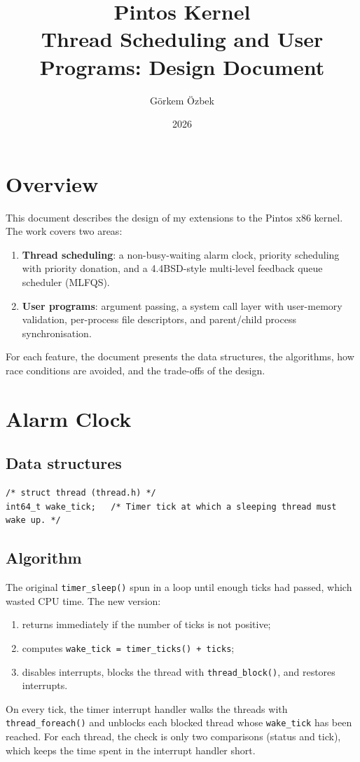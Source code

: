 \documentclass[a4paper,11pt]{article}
\title{\textbf{Pintos Kernel}\\[0.3em]\large Thread Scheduling and User Programs: Design Document}
\author{G\"orkem \"Ozbek}
\date{2026}
\newcommand{\code}[1]{\texttt{#1}}
\begin{document}
\maketitle
\thispagestyle{fancy}

\section*{Overview}

This document describes the design of my extensions to the Pintos x86 kernel. The work covers two areas:

\begin{enumerate}
  \item \textbf{Thread scheduling}: a non-busy-waiting alarm clock, priority scheduling with priority donation, and a 4.4BSD-style multi-level feedback queue scheduler (MLFQS).
  \item \textbf{User programs}: argument passing, a system call layer with user-memory validation, per-process file descriptors, and parent/child process synchronisation.
\end{enumerate}

For each feature, the document presents the data structures, the algorithms, how race conditions are avoided, and the trade-offs of the design.

\section{Alarm Clock}

\subsection*{Data structures}
\begin{Verbatim}[frame=single]
/* struct thread (thread.h) */
int64_t wake_tick;   /* Timer tick at which a sleeping thread must wake up. */
\end{Verbatim}

\subsection*{Algorithm}
The original \code{timer\_sleep()} spun in a loop until enough ticks had passed, which wasted CPU time. The new version:
\begin{enumerate}
  \item returns immediately if the number of ticks is not positive;
  \item computes \code{wake\_tick = timer\_ticks() + ticks};
  \item disables interrupts, blocks the thread with \code{thread\_block()}, and restores interrupts.
\end{enumerate}
On every tick, the timer interrupt handler walks the threads with \code{thread\_foreach()} and unblocks each blocked thread whose \code{wake\_tick} has been reached. For each thread, the check is only two comparisons (status and tick), which keeps the time spent in the interrupt handler short.
\end{document}
